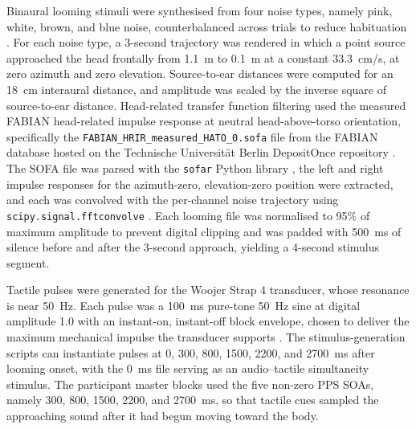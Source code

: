 Binaural looming stimuli were synthesised from four noise types, namely pink, white, brown, and blue noise, counterbalanced across trials to reduce habituation \citep{brinkmann2017fabian}. For each noise type, a 3-second trajectory was rendered in which a point source approached the head frontally from 1.1~m to 0.1~m at a constant 33.3~cm/s, at zero azimuth and zero elevation. Source-to-ear distances were computed for an 18~cm interaural distance, and amplitude was scaled by the inverse square of source-to-ear distance. Head-related transfer function filtering used the measured FABIAN head-related impulse response at neutral head-above-torso orientation, specifically the \texttt{FABIAN\_HRIR\_measured\_HATO\_0.sofa} file from the FABIAN database hosted on the Technische Universit\"at Berlin DepositOnce repository \citep{fabian_database_2017, brinkmann2017fabian}. The SOFA file was parsed with the \texttt{sofar} Python library \citep{sofar_python}, the left and right impulse responses for the azimuth-zero, elevation-zero position were extracted, and each was convolved with the per-channel noise trajectory using \texttt{scipy.signal.fftconvolve} \citep{Virtanen2020SciPy}. Each looming file was normalised to 95\% of maximum amplitude to prevent digital clipping and was padded with 500~ms of silence before and after the 3-second approach, yielding a 4-second stimulus segment.

Tactile pulses were generated for the Woojer Strap 4 transducer, whose resonance is near 50~Hz. Each pulse was a 100~ms pure-tone 50~Hz sine at digital amplitude 1.0 with an instant-on, instant-off block envelope, chosen to deliver the maximum mechanical impulse the transducer supports \citep{woojer_strap4}. The stimulus-generation scripts can instantiate pulses at 0, 300, 800, 1500, 2200, and 2700~ms after looming onset, with the 0~ms file serving as an audio--tactile simultaneity stimulus. The participant master blocks used the five non-zero PPS SOAs, namely 300, 800, 1500, 2200, and 2700~ms, so that tactile cues sampled the approaching sound after it had begun moving toward the body.

